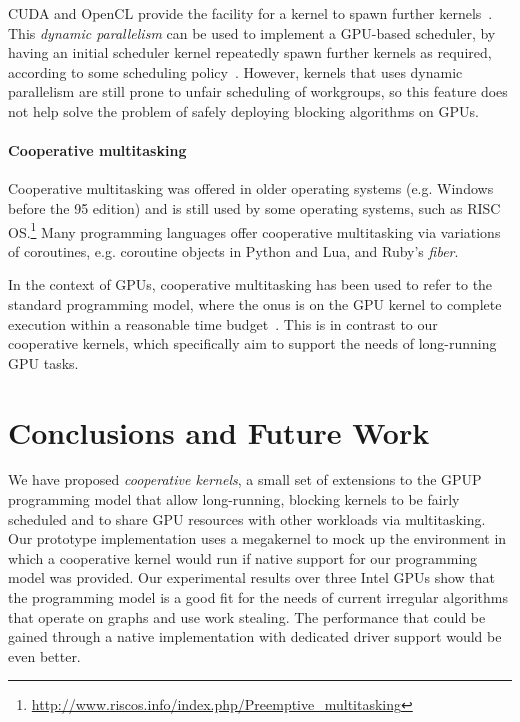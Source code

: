 \documentclass[numbers,nocopyrightspace,10pt]{sigplanconf}
\begin{document}
CUDA and OpenCL provide the facility for a kernel to spawn further kernels~\cite{cuda-75,opencl2Spec}.
This \emph{dynamic parallelism} can be used to implement a
GPU-based scheduler, by having an initial scheduler kernel repeatedly
spawn further kernels as required, according to some scheduling
policy~\cite{DBLP:conf/ppopp/Muyan-OzcelikO16}.  However, kernels
that uses dynamic parallelism are still prone to unfair scheduling of workgroups, so this feature
does not help solve the problem of safely deploying blocking
algorithms on GPUs.

\paragraph{Cooperative multitasking}

Cooperative multitasking was offered in older operating systems
(e.g. Windows before the 95 edition) and is still used by some
operating systems, such as RISC
OS.\footnote{\url{http://www.riscos.info/index.php/Preemptive_multitasking}}
Many programming languages offer cooperative multitasking via
variations of coroutines, e.g. coroutine objects in
Python
and Lua,
and Ruby's
\emph{fiber}.

In the context of GPUs, cooperative multitasking has been used to
refer to the standard programming model, where the onus is on the GPU kernel
to complete execution within a reasonable time budget~\cite{adriaens2012case,CPE:CPE1722}.
%
This is in contrast to our cooperative kernels, which specifically aim to support the needs of long-running GPU tasks.


\section{Conclusions and Future Work}\label{sec:conclusion}

We have proposed \emph{cooperative kernels}, a small set of extensions
to the GPUP programming model that allow long-running, blocking
kernels to be fairly scheduled and to share GPU resources with other
workloads via multitasking.  Our prototype implementation uses a
megakernel to mock up the environment in which a cooperative kernel
would run if native support for our programming model was provided.
Our experimental results over three Intel GPUs show that the
programming model is a good fit for the needs of current irregular
algorithms that operate on graphs and use work stealing.  The
performance that could be gained through a native implementation with
dedicated driver support would be even better.
\end{document}
